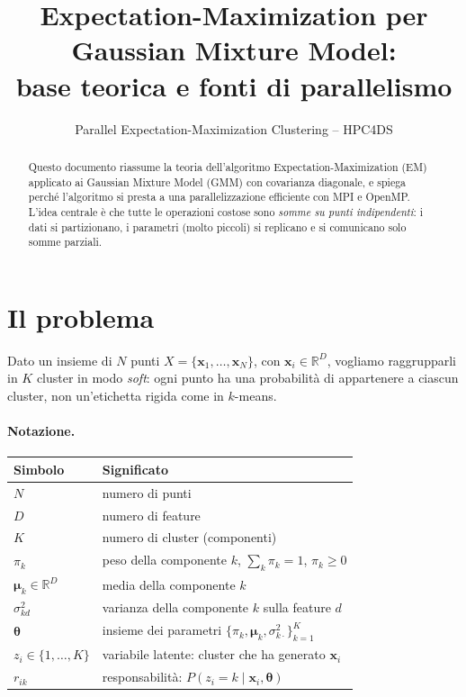 \documentclass[11pt,a4paper]{article}
\title{Expectation-Maximization per Gaussian Mixture Model:\\
base teorica e fonti di parallelismo}
\author{Parallel Expectation-Maximization Clustering -- HPC4DS}
\date{}
\newcommand{\bx}{\mathbf{x}}
\newcommand{\bmu}{\boldsymbol{\mu}}
\newcommand{\bth}{\boldsymbol{\theta}}
\theoremstyle{definition}
\begin{document}
\maketitle

\begin{abstract}
Questo documento riassume la teoria dell'algoritmo Expectation-Maximization (EM)
applicato ai Gaussian Mixture Model (GMM) con covarianza diagonale, e spiega
perché l'algoritmo si presta a una parallelizzazione efficiente con MPI e
OpenMP. L'idea centrale è che tutte le operazioni costose sono \emph{somme su
punti indipendenti}: i dati si partizionano, i parametri (molto piccoli) si
replicano e si comunicano solo somme parziali.
\end{abstract}

\section{Il problema}
Dato un insieme di $N$ punti $X=\{\bx_1,\dots,\bx_N\}$, con $\bx_i\in\mathbb{R}^D$,
vogliamo raggrupparli in $K$ cluster in modo \emph{soft}: ogni punto ha una
probabilità di appartenere a ciascun cluster, non un'etichetta rigida come in
$k$-means.

\paragraph{Notazione.}
\begin{center}
\begin{tabular}{ll}
\toprule
Simbolo & Significato \\
\midrule
$N$ & numero di punti \\
$D$ & numero di feature \\
$K$ & numero di cluster (componenti) \\
$\pi_k$ & peso della componente $k$, $\sum_k\pi_k=1$, $\pi_k\ge 0$ \\
$\bmu_k\in\mathbb{R}^D$ & media della componente $k$ \\
$\sigma_{kd}^2$ & varianza della componente $k$ sulla feature $d$ \\
$\bth$ & insieme dei parametri $\{\pi_k,\bmu_k,\sigma^2_{k\cdot}\}_{k=1}^K$ \\
$z_i\in\{1,\dots,K\}$ & variabile latente: cluster che ha generato $\bx_i$ \\
$r_{ik}$ & responsabilità: $P(z_i=k\mid\bx_i,\bth)$ \\
\bottomrule
\end{tabular}
\end{center}
\end{document}
